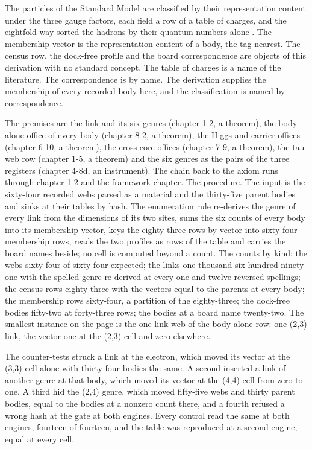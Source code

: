 \begin{chbridge}
The particles of the Standard Model are classified by their representation content under the three gauge factors, each field a row of a table of charges, and the eightfold way sorted the hadrons by their quantum numbers alone \cite{GellMannNeeman1964,Peskin1995}.
The membership vector is the representation content of a body, the tag nearest. The census row, the dock-free profile and the board correspondence are objects of this derivation with no standard concept. The table of charges is a name of the literature. The correspondence is by name. The derivation supplies the membership of every recorded body here, and the classification is named by correspondence.
\end{chbridge}
\begin{chproof}[instrument]
The premises are the link and its six genres (chapter 1-2, a theorem), the body-alone office of every body (chapter 8-2, a theorem), the Higgs and carrier offices (chapter 6-10, a theorem), the cross-core offices (chapter 7-9, a theorem), the tau web row (chapter 1-5, a theorem) and the six genres as the pairs of the three registers (chapter 4-8d, an instrument). The chain back to the axiom runs through chapter 1-2 and the framework chapter. The procedure. The input is the sixty-four recorded webs parsed as a material and the thirty-five parent bodies and sinks at their tables by hash. The enumeration rule re-derives the genre of every link from the dimensions of its two sites, sums the six counts of every body into its membership vector, keys the eighty-three rows by vector into sixty-four membership rows, reads the two profiles as rows of the table and carries the board names beside; no cell is computed beyond a count. The counts by kind: the webs sixty-four of sixty-four expected; the links one thousand six hundred ninety-one with the spelled genre re-derived at every one and twelve reversed spellings; the census rows eighty-three with the vectors equal to the parents at every body; the membership rows sixty-four, a partition of the eighty-three; the dock-free bodies fifty-two at forty-three rows; the bodies at a board name twenty-two. The smallest instance on the page is the one-link web of the body-alone row: one (2,3) link, the vector one at the (2,3) cell and zero elsewhere.

The counter-tests struck a link at the electron, which moved its vector at the (3,3) cell alone with thirty-four bodies the same. A second inserted a link of another genre at that body, which moved its vector at the (4,4) cell from zero to one. A third hid the (2,4) genre, which moved fifty-five webs and thirty parent bodies, equal to the bodies at a nonzero count there, and a fourth refused a wrong hash at the gate at both engines. Every control read the same at both engines, fourteen of fourteen, and the table was reproduced at a second engine, equal at every cell.
\end{chproof}

